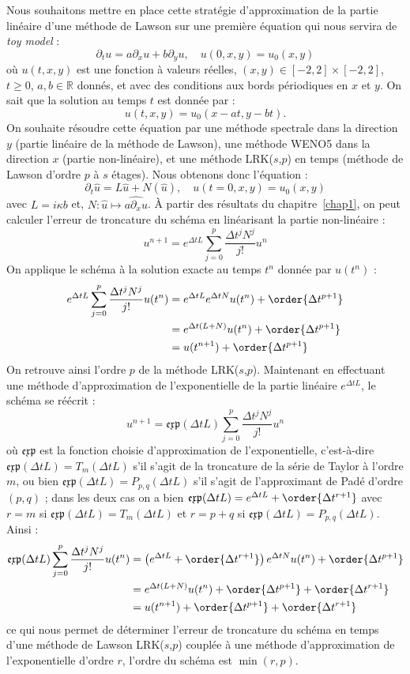 Nous souhaitons mettre en place cette stratégie d'approximation de la partie linéaire d'une méthode de Lawson sur une première équation qui nous servira de \emph{toy model} :
$$
  \partial_t u = a\partial_x u + b\partial_y u,\quad u(0,x,y)=u_0(x,y)
$$
où $u(t,x,y)$ est une fonction à valeurs réelles, $(x,y)\in[-2,2]\times[-2,2]$, $t\geq0$, $a,b\in\mathbb{R}$ donnés, et avec des conditions aux bords périodiques en $x$ et $y$. On sait que la solution au temps $t$ est donnée par :
$$
  u(t,x,y) = u_0(x-at,y-bt).
$$
On souhaite résoudre cette équation par une méthode spectrale dans la direction $y$ (partie linéaire de la méthode de Lawson), une méthode WENO5 dans la direction $x$ (partie non-linéaire), et une méthode LRK($s$,$p$) en temps (méthode de Lawson d'ordre $p$ à $s$ étages). Nous obtenons donc l'équation :
$$
  \partial_t \hat{u} = L\hat{u} + N(\hat{u}),\quad u(t=0,x,y) = u_0(x,y)
$$
avec $L = i\kappa b$ et, $N:\hat{u}\mapsto\widehat{a\partial_xu}$. À partir des résultats du chapitre~\ref{chap1}, on peut calculer l'erreur de troncature du schéma en linéarisant la partie non-linéaire :
$$
  u^{n+1} = e^{\Delta tL}\sum_{j=0}^{p}\frac{\Delta t^jN^j}{j!}u^n
$$
On applique le schéma à la solution exacte au temps $t^n$ donnée par $u(t^n)$ :
$$
  \begin{aligned}
    e^{\Delta tL}\sum_{j=0}^{p}\frac{\Delta t^jN^j}{j!}u(t^n) &= e^{\Delta t L}e^{\Delta t N}u(t^n) + \order{\Delta t^{p+1}} \\
      &= e^{\Delta t(L+N)}u(t^n) + \order{\Delta t^{p+1}} \\
      &= u(t^{n+1}) + \order{\Delta t^{p+1}}
  \end{aligned}
$$
On retrouve ainsi l'ordre $p$ de la méthode LRK($s$,$p$). Maintenant en effectuant une méthode d'approximation de l'exponentielle de la partie linéaire $e^{\Delta tL}$, le schéma se réécrit :
$$
  u^{n+1} = \mathfrak{exp}(\Delta tL)\sum_{j=0}^{p}\frac{\Delta t^jN^j}{j!}u^n
$$
où $\mathfrak{exp}$ est la fonction choisie d'approximation de l'exponentielle, c'est-à-dire $\mathfrak{exp}(\Delta tL) = T_m(\Delta tL)$ s'il s'agit de la troncature de la série de Taylor à l'ordre $m$, ou bien $\mathfrak{exp}(\Delta tL) = P_{p,q}(\Delta tL)$ s'il s'agit de l'approximant de Padé d'ordre $(p,q)$ ; dans les deux cas on a bien $\mathfrak{exp}(\Delta tL) = e^{\Delta tL} + \order{\Delta t^{r+1}}$ avec $r = m$ si $\mathfrak{exp}(\Delta tL) = T_m(\Delta tL)$ et $r = p+q$ si $\mathfrak{exp}(\Delta tL) = P_{p,q}(\Delta tL)$. Ainsi :
$$
  \begin{aligned}
    \mathfrak{exp}(\Delta tL)\sum_{j=0}^{p}\frac{\Delta t^jN^j}{j!}u(t^n) &= \left(e^{\Delta t L} + \order{\Delta t^{r+1}}\right)e^{\Delta t N}u(t^n) + \order{\Delta t^{p+1}} \\
      &= e^{\Delta t(L+N)}u(t^n) + \order{\Delta t^{p+1}} + \order{\Delta t^{r+1}} \\
      &= u(t^{n+1}) + \order{\Delta t^{p+1}} + \order{\Delta t^{r+1}}
  \end{aligned}
$$
ce qui nous permet de déterminer l'erreur de troncature du schéma en temps d'une méthode de Lawson LRK($s$,$p$) couplée à une méthode d'approximation de l'exponentielle d'ordre $r$, l'ordre du schéma est $\min(r,p)$.

